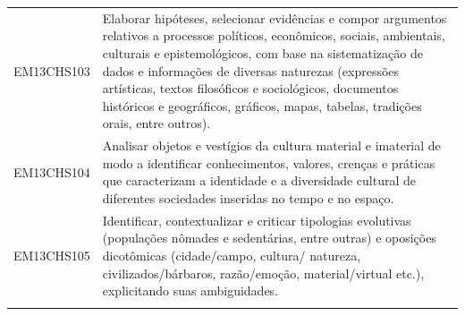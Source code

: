 \documentclass[12pt]{extarticle}
\begin{document}
\begin{longtable}{ll}
EM13CHS103 & Elaborar hipóteses, selecionar evidências e compor argumentos relativos a processos políticos, econômicos, sociais, ambientais, culturais e epistemológicos, com base na sistematização de dados e informações de diversas naturezas (expressões artísticas, textos filosóficos e sociológicos, documentos históricos e geográficos, gráficos, mapas, tabelas, tradições orais, entre outros).                                                                                                                                                                                                                                                                                                                                                                                                                        \\
\rowcolor[HTML]{FFF} 
EM13CHS104 & Analisar objetos e vestígios da cultura material e imaterial de modo a identificar conhecimentos, valores, crenças e práticas que caracterizam a identidade e a diversidade cultural de diferentes sociedades inseridas no tempo e no espaço.                                                                                                                                                                                                                                                                                                                                                                                                                                                                                                                                                                         \\
\rowcolor[HTML]{E0F7FA} 
EM13CHS105 & Identificar, contextualizar e criticar tipologias evolutivas (populações nômades e sedentárias, entre outras) e oposições dicotômicas (cidade/campo, cultura/ natureza, civilizados/bárbaros, razão/emoção, material/virtual etc.), explicitando suas ambiguidades.                                                                                                                                                                                                                                                                                                                                                                                                                                                                                                                                                   \\
\rowcolor[HTML]{FFF} 

\end{longtable}
\end{document}
